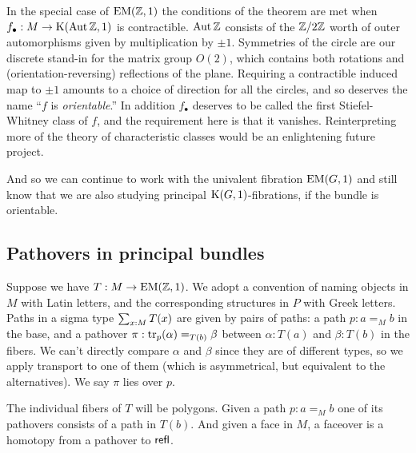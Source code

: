 In the special case of \( \mathrm{EM}(\mathbb{Z},1) \) the conditions of the theorem are met when \( f_\bullet:M\to\mathrm{K}(\operatorname{Aut} \mathbb{Z}, 1) \) is contractible. \( \operatorname{Aut}\mathbb{Z} \) consists of the \( \mathbb{Z}/2\mathbb{Z} \) worth of outer automorphisms given by multiplication by \( \pm 1 \). Symmetries of the circle are our discrete stand-in for the matrix group \( O(2) \), which contains both rotations and (orientation-reversing) reflections of the plane. Requiring a contractible induced map to \( \pm 1 \) amounts to a choice of direction for all the circles, and so deserves the name ``\( f \) is \emph{orientable}.'' In addition \( f_\bullet \) deserves to be called the first Stiefel-Whitney class of \( f \), and the requirement here is that it vanishes. Reinterpreting more of the theory of characteristic classes would be an enlightening future project.

And so we can continue to work with the univalent fibration \( \mathrm{EM}(G,1) \) and still know that we are also studying principal \( \mathrm{K}(G,1) \)-fibrations, if the bundle is orientable.

\subsection{Pathovers in principal bundles}
Suppose we have \( T:M\to\mathrm{EM}(\mathbb{Z},1) \). We adopt a convention of naming objects in \( M \) with Latin letters, and the corresponding structures in \( P \) with Greek letters. Paths in a sigma type \( \sum_{x:M}T(x) \) are given by pairs of paths: a path \( p:a=_M b \) in the base, and a pathover \( \pi:\mathrm{tr}_p(\alpha)=_{T(b)}\beta \) between \( \alpha:T(a) \) and \( \beta:T(b) \) in the fibers. We can't directly compare \( \alpha \) and \( \beta \) since they are of different types, so we apply transport to one of them (which is asymmetrical, but equivalent to the alternatives). We say \( \pi \) lies over \( p \). 

The individual fibers of \( T \) will be polygons. Given a path \( p:a=_M b \) one of its pathovers consists of a path in \( T(b) \). And given a face in \( M \), a faceover is a homotopy from a pathover to \( \mathsf{refl} \).

